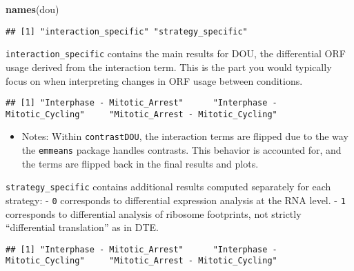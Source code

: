 \documentclass[
]{article}
\newenvironment{Shaded}{\begin{snugshade}}{\end{snugshade}}
\newcommand{\FunctionTok}[1]{\textcolor[rgb]{0.13,0.29,0.53}{\textbf{#1}}}
\newcommand{\NormalTok}[1]{#1}
\newcommand{\SpecialCharTok}[1]{\textcolor[rgb]{0.81,0.36,0.00}{\textbf{#1}}}
\providecommand{\tightlist}{%
  \setlength{\itemsep}{0pt}\setlength{\parskip}{0pt}}
\begin{document}
\begin{Shaded}
\begin{Highlighting}[]
\FunctionTok{names}\NormalTok{(dou)}
\end{Highlighting}
\end{Shaded}

\begin{verbatim}
## [1] "interaction_specific" "strategy_specific"
\end{verbatim}

\texttt{interaction\_specific} contains the main results for DOU, the
differential ORF usage derived from the interaction term. This is the
part you would typically focus on when interpreting changes in ORF usage
between conditions.

\begin{Shaded}
\end{Shaded}

\begin{verbatim}
## [1] "Interphase - Mitotic_Arrest"      "Interphase - Mitotic_Cycling"     "Mitotic_Arrest - Mitotic_Cycling"
\end{verbatim}

\begin{itemize}
\tightlist
\item
  Notes: Within \texttt{contrastDOU}, the interaction terms are flipped
  due to the way the \texttt{emmeans} package handles contrasts. This
  behavior is accounted for, and the terms are flipped back in the final
  results and plots.
\end{itemize}

\texttt{strategy\_specific} contains additional results computed
separately for each strategy: - \texttt{0} corresponds to differential
expression analysis at the RNA level. - \texttt{1} corresponds to
differential analysis of ribosome footprints, not strictly
``differential translation'' as in DTE.

\begin{Shaded}
\end{Shaded}

\begin{verbatim}
## [1] "Interphase - Mitotic_Arrest"      "Interphase - Mitotic_Cycling"     "Mitotic_Arrest - Mitotic_Cycling"
\end{verbatim}
\end{document}
